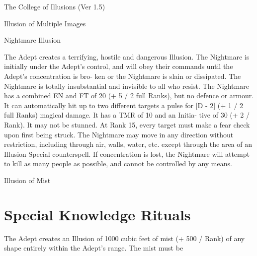 \begin{Chapter}{The College of Illusions (Ver 1.5)}
\begin{spell}[S-13]{Illusion of Multiple Images }
\begin{effects}
\end{effects}
\end{spell}

\begin{spell}[S-14]{Nightmare Illusion }

\begin{effects}
The Adept creates a terrifying, hostile and 
dangerous  Illusion.  The  Nightmare  is  initially 
under  the  Adept’s  control,  and  will  obey  their 
commands  until  the  Adept’s  concentration  is  bro-
ken  or  the  Nightmare  is  slain  or  dissipated.  The 
Nightmare  is  totally  insubstantial  and  invisible  to 
all  who  resist.  The  Nightmare  has a combined  EN 
and FT of 20 (+ 5 / 2 full Ranks), but no defence or 
armour. It can automatically hit up to two different 
targets  a  pulse  for  [D  -  2]  (+  1  /  2  full  Ranks) 
magical damage. It has a TMR of 10 and an Initia-
tive  of  30  (+ 2 / Rank).  It  may  not  be  stunned.  At 
Rank 15, every target must make a fear check upon 
first being struck. The Nightmare may move in any 
direction without restriction, including through air, 
walls,  water,  etc.  except  through  the  area  of  an 
Illusion  Special  counterspell.  If  concentration  is 
lost,  the  Nightmare  will  attempt  to  kill  as  many 
people as possible, and cannot be controlled by any 
means. 

\end{effects}
\end{spell}

\begin{spell}[S-12]{Illusion of Mist }


\end{spell}

\section{Special Knowledge Rituals}

\begin{effects}
 The  Adept  creates  an  Illusion  of  1000 
cubic  feet  of  mist  (+  500  /  Rank)  of  any  shape 
entirely within the Adept’s range. The mist must be 


\end{effects}
\end{Chapter}

